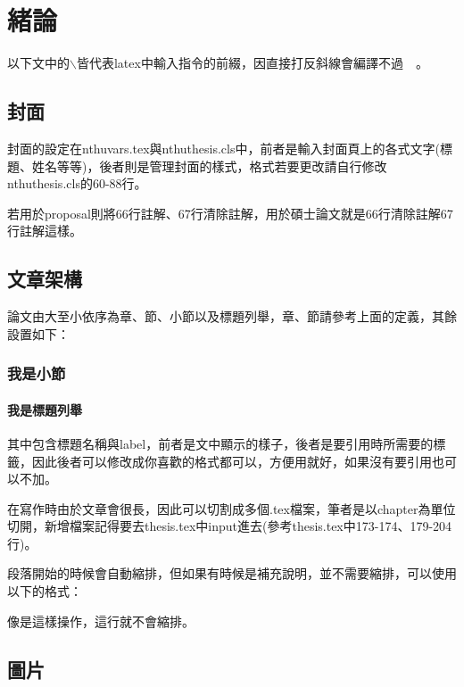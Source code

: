 \chapter{緒論}
\label{c:introduction}

以下文中的$\backslash$皆代表latex中輸入指令的前綴，因直接打反斜線會編譯不過~~。

\section{封面}
\label{sec:cover}

封面的設定在nthuvars.tex與nthuthesis.cls中，前者是輸入封面頁上的各式文字(標題、姓名等等)，後者則是管理封面的樣式，格式若要更改請自行修改nthuthesis.cls的60-88行。

若用於proposal則將66行註解、67行清除註解，用於碩士論文就是66行清除註解67行註解這樣。

\section{文章架構}
\label{sec:architecture}

論文由大至小依序為章、節、小節以及標題列舉，章、節請參考上面的定義，其餘設置如下：

\subsection{我是小節}
\label{subsec:subsection}

\subsubsection{我是標題列舉}
\label{subsubsec:subsubsection}

其中包含標題名稱與label，前者是文中顯示的樣子，後者是要引用時所需要的標籤，因此後者可以修改成你喜歡的格式都可以，方便用就好，如果沒有要引用也可以不加。

在寫作時由於文章會很長，因此可以切割成多個.tex檔案，筆者是以chapter為單位切開，新增檔案記得要去thesis.tex中input進去(參考thesis.tex中173-174、179-204行)。

段落開始的時候會自動縮排，但如果有時候是補充說明，並不需要縮排，可以使用以下的格式：

\noindent 像是這樣操作，這行就不會縮排。

\section{圖片}
\label{sec:fig}

